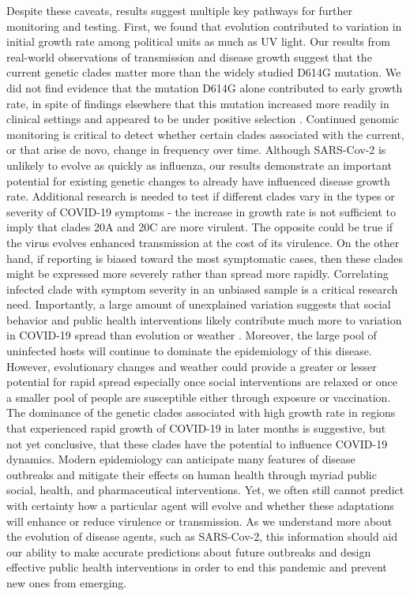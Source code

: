 \documentclass[9pt,twocolumn,twoside,lineno]{pnas-new}
\begin{document}
Despite these caveats, results suggest multiple key pathways for further monitoring and testing. First, we found that evolution contributed to variation in initial growth rate among political units as much as UV light. Our results from real-world observations of transmission and disease growth suggest that the current genetic clades matter more than the widely studied D614G mutation. We did not find evidence that the mutation D614G alone contributed to early growth rate, in spite of findings elsewhere that this mutation increased more readily in clinical settings and appeared to be under positive selection \cite{Korber2020-qd, Zhan2020-za, Grubaugh2020-ps}. Continued genomic monitoring is critical to detect whether certain clades associated with the current, or that arise de novo, change in frequency over time. 
Although SARS-Cov-2 is unlikely to evolve as quickly as influenza, our results demonstrate an important potential for existing genetic changes to already have influenced disease growth rate. Additional research is needed to test if different clades vary in the types or severity of COVID-19 symptoms - the increase in growth rate is not sufficient to imply that clades 20A and 20C are more virulent. The opposite could be true if the virus evolves enhanced transmission at the cost of its virulence. On the other hand, if reporting is biased toward the most symptomatic cases, then these clades might be expressed more severely rather than spread more rapidly. Correlating infected clade with symptom severity in an unbiased sample is a critical research need.
Importantly, a large amount of unexplained variation suggests that social behavior and public health interventions likely contribute much more to variation in COVID-19 spread than evolution or weather \cite{Flaxman2020-uz}. Moreover, the large pool of uninfected hosts will continue to dominate the epidemiology of this disease. However, evolutionary changes and weather could provide a greater or lesser potential for rapid spread especially once social interventions are relaxed or once a smaller pool of people are susceptible either through exposure or vaccination. The dominance of the genetic clades associated with high growth rate in regions that experienced rapid growth of COVID-19 in later months is suggestive, but not yet conclusive, that these clades have the potential to influence COVID-19 dynamics. 
Modern epidemiology can anticipate many features of disease outbreaks and mitigate their effects on human health through myriad public social, health, and pharmaceutical interventions. Yet, we often still cannot predict with certainty how a particular agent will evolve and whether these adaptations will enhance or reduce virulence or transmission. As we understand more about the evolution of disease agents, such as SARS-Cov-2, this information should aid our ability to make accurate predictions about future outbreaks and design effective public health interventions in order to end this pandemic and prevent new ones from emerging.
\end{document}
